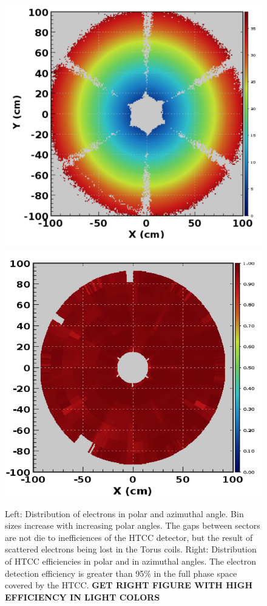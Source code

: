 \documentclass[final,3p,twocolumn]{elsarticle}
\begin{document}
\begin{figure}[htbp!]
{\includegraphics[width=1.0\columnwidth]{htcc-dis.png}}
{\includegraphics[width=1.0\columnwidth]{htcc-eff.png}}
\caption{ Left: Distribution of electrons in polar and azimuthal angle. Bin sizes increase with increasing polar angles. The 
gaps between sectors are not die to inefficiences of the HTCC detector, but the result of scattered electrons being lost in the 
Torus coils. 
Right: Distribution of HTCC efficiencies in polar and in azimuthal angles. The electron detection efficiency is greater than 95\% 
in the full phase space covered by the HTCC. {\bf GET RIGHT FIGURE WITH HIGH EFFICIENCY IN LIGHT COLORS}  } 
\label{htcc-eff}
\end{figure}
\end{document}
